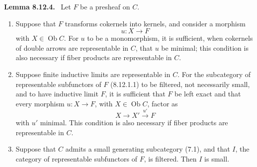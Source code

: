 \documentclass[11pt]{article}
\newcommand{\Ob}{\operatorname{Ob}}
\newenvironment{statement}[1]{\par\medskip\noindent\textbf{#1.}\ }{\par\medskip}
\begin{document}
\begin{statement}{Lemma 8.12.4}
Let $F$ be a presheaf on $C$.
\begin{enumerate}[label=\alph*)]
\item Suppose that $F$ transforms cokernels into kernels, and consider a morphism
\[
 u:X\longrightarrow F
\]
with $X\in\Ob C$. For $u$ to be a monomorphism, it is sufficient, when cokernels of double arrows are representable in $C$, that $u$ be minimal; this condition is also necessary if fiber products are representable in $C$.

\item Suppose finite inductive limits are representable in $C$. For the subcategory of representable subfunctors of $F$ (8.12.1.1) to be filtered, not necessarily small, and to have inductive limit $F$, it is sufficient that $F$ be left exact and that every morphism $u:X\to F$, with $X\in\Ob C$, factor as
\[
 X\longrightarrow X'\xrightarrow{u'}F
\]
with $u'$ minimal. This condition is also necessary if fiber products are representable in $C$.

\item Suppose that $C$ admits a small generating subcategory (7.1), and that $I$, the category of representable subfunctors of $F$, is filtered. Then $I$ is small.
\end{enumerate}
\end{statement}
\end{document}
